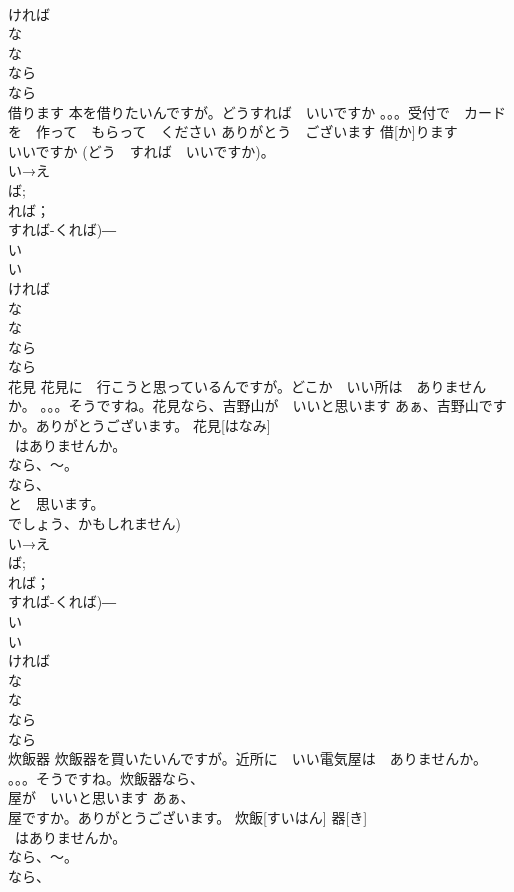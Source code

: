 \documentclass[8pt]{extreport}
\begin{document}
\begin{CJK}{UTF8}{min}
\\	ければ　
\\	な 
\\	な
\\	なら　
\\	なら
\\	借ります	本を借りたいんですが。どうすれば　いいですか 。。。受付で　カードを　作って　もらって　ください ありがとう　ございます	借[か]ります			
\\	いいですか (どう　すれば　いいですか)。
\\	い→え
\\	ば;
\\	れば；
\\	すれば-くれば)―　
\\	い
\\	い　
\\	ければ　
\\	な 
\\	な
\\	なら　
\\	なら
\\	花見	花見に　行こうと思っているんですが。どこか　いい所は　ありませんか。 。。。そうですね。花見なら、吉野山が　いいと思います あぁ、吉野山ですか。ありがとうございます。	花見[はなみ]			
\\	~はありませんか。
\\	なら、～。
\\	なら、
\\	と　思います。
\\	でしょう、かもしれません)	
\\	い→え
\\	ば;
\\	れば；
\\	すれば-くれば)―　
\\	い
\\	い　
\\	ければ　
\\	な 
\\	な
\\	なら　
\\	なら
\\	炊飯器	炊飯器を買いたいんですが。近所に　いい電気屋は　ありませんか。 。。。そうですね。炊飯器なら、
\\	屋が　いいと思います あぁ、
\\	屋ですか。ありがとうございます。	炊飯[すいはん] 器[き]			
\\	~はありませんか。
\\	なら、～。
\\	なら、

\end{CJK}
\end{document}
